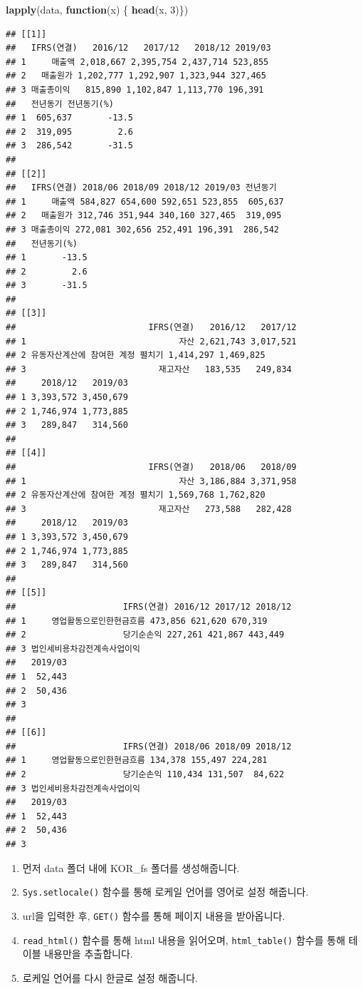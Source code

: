 \documentclass[12pt,]{book}
\newenvironment{Shaded}{\begin{snugshade}}{\end{snugshade}}
\newcommand{\ControlFlowTok}[1]{\textcolor[rgb]{0.13,0.29,0.53}{\textbf{#1}}}
\newcommand{\DecValTok}[1]{\textcolor[rgb]{0.00,0.00,0.81}{#1}}
\newcommand{\KeywordTok}[1]{\textcolor[rgb]{0.13,0.29,0.53}{\textbf{#1}}}
\newcommand{\NormalTok}[1]{#1}
\providecommand{\tightlist}{%
  \setlength{\itemsep}{0pt}\setlength{\parskip}{0pt}}
\begin{document}
\begin{Shaded}
\begin{Highlighting}[]
\KeywordTok{lapply}\NormalTok{(data, }\ControlFlowTok{function}\NormalTok{(x) \{}
  \KeywordTok{head}\NormalTok{(x, }\DecValTok{3}\NormalTok{)\})}
\end{Highlighting}
\end{Shaded}

\begin{verbatim}
## [[1]]
##   IFRS(연결)   2016/12   2017/12   2018/12 2019/03
## 1     매출액 2,018,667 2,395,754 2,437,714 523,855
## 2   매출원가 1,202,777 1,292,907 1,323,944 327,465
## 3 매출총이익   815,890 1,102,847 1,113,770 196,391
##   전년동기 전년동기(%)
## 1  605,637       -13.5
## 2  319,095         2.6
## 3  286,542       -31.5
## 
## [[2]]
##   IFRS(연결) 2018/06 2018/09 2018/12 2019/03 전년동기
## 1     매출액 584,827 654,600 592,651 523,855  605,637
## 2   매출원가 312,746 351,944 340,160 327,465  319,095
## 3 매출총이익 272,081 302,656 252,491 196,391  286,542
##   전년동기(%)
## 1       -13.5
## 2         2.6
## 3       -31.5
## 
## [[3]]
##                          IFRS(연결)   2016/12   2017/12
## 1                              자산 2,621,743 3,017,521
## 2 유동자산계산에 참여한 계정 펼치기 1,414,297 1,469,825
## 3                          재고자산   183,535   249,834
##     2018/12   2019/03
## 1 3,393,572 3,450,679
## 2 1,746,974 1,773,885
## 3   289,847   314,560
## 
## [[4]]
##                          IFRS(연결)   2018/06   2018/09
## 1                              자산 3,186,884 3,371,958
## 2 유동자산계산에 참여한 계정 펼치기 1,569,768 1,762,820
## 3                          재고자산   273,588   282,428
##     2018/12   2019/03
## 1 3,393,572 3,450,679
## 2 1,746,974 1,773,885
## 3   289,847   314,560
## 
## [[5]]
##                     IFRS(연결) 2016/12 2017/12 2018/12
## 1     영업활동으로인한현금흐름 473,856 621,620 670,319
## 2                   당기순손익 227,261 421,867 443,449
## 3 법인세비용차감전계속사업이익                        
##   2019/03
## 1  52,443
## 2  50,436
## 3        
## 
## [[6]]
##                     IFRS(연결) 2018/06 2018/09 2018/12
## 1     영업활동으로인한현금흐름 134,378 155,497 224,281
## 2                   당기순손익 110,434 131,507  84,622
## 3 법인세비용차감전계속사업이익                        
##   2019/03
## 1  52,443
## 2  50,436
## 3
\end{verbatim}

\begin{enumerate}
\def\labelenumi{\arabic{enumi}.}
\tightlist
\item
  먼저 data 폴더 내에 KOR\_fs 폴더를 생성해줍니다.
\item
  \texttt{Sys.setlocale()} 함수를 통해 로케일 언어를 영어로 설정 해줍니다.
\item
  url을 입력한 후, \texttt{GET()} 함수를 통해 페이지 내용을 받아옵니다.
\item
  \texttt{read\_html()} 함수를 통해 html 내용을 읽어오며, \texttt{html\_table()} 함수를 통해 테이블 내용만을 추출합니다.
\item
  로케일 언어를 다시 한글로 설정 해줍니다.
\end{enumerate}
\end{document}
